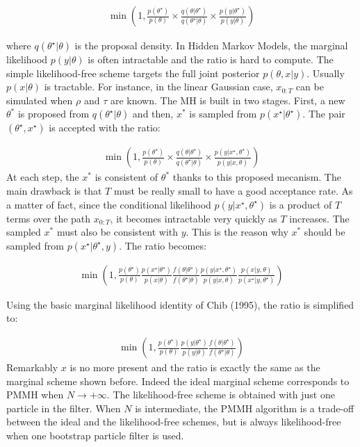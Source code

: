 \documentclass[11pt,a4,twosided,singlespacing,titlepagenumber=on]{scrreprt}
\numberwithin{equation}{chapter} %
\theoremstyle{remark}
\begin{document}
\begin{align*}
\min \left( 1, \frac{p(\theta^\star)}{p(\theta)} \times  \frac{q(\theta|\theta^\star)}{q(\theta^\star|\theta)} \times \frac{p({y}|\theta^\star)}{p({y}|\theta)} \right)
\end{align*}

where $q(\theta^\star|\theta)$ is the proposal density. In Hidden Markov Models, the marginal likelihood $p(y|\theta)$ is often intractable and the ratio is hard to compute. The simple likelihood-free scheme targets the full joint posterior $p(\theta,x|y)$. Usually $p(x|\theta)$ is tractable. For instance, in the linear Gaussian case, $x_{0:T}$ can be simulated when $\rho$ and $\tau$ are known. The MH is built in two stages. First, a new $\theta^*$ is proposed from $q(\theta^\star|\theta)$ and then, $x^*$ is sampled from $p(x^\star|\theta^\star)$. The pair $(\theta^\star,x^\star)$ is accepted with the ratio:

\begin{align*}
\min \left( 1, \frac{p(\theta^\star)}{p(\theta)} \times  \frac{q(\theta|\theta^\star)}{q(\theta^\star|\theta)} \times \frac{p(y|{x}^\star,\theta^\star)}{p(y|{x},\theta)} \right)
\end{align*}
At each step, the $x^*$ is consistent of $\theta^*$ thanks to this proposed mecanism. The main drawback is that $T$ must be really small to have a good acceptance rate. As a matter of fact, since the conditional likelihood $p(y|{x}^\star,\theta^\star)$ is a product of $T$ terms over the path $x_{0:T}$, it becomes intractable very quickly as $T$ increases. The sampled $x^*$ must also be consistent with $y$. This is the reason why $x^*$ should be sampled from $p(x^\star|\theta^\star,y)$. The ratio becomes:

\begin{align*}
 \min \left(1, \frac{p(\theta^\star)}{p(\theta)}   \frac{p({x}^\star|\theta^\star)}{p({x}|\theta)}   \frac{f(\theta|\theta^\star)}{f(\theta^\star|\theta)}   \frac{p(y|{x}^\star,\theta^\star)}{p(y|{x},\theta)}  \frac{p({x}|y,\theta)}{p({x}^\star|y,\theta^\star)} \right)
\end{align*}

Using the basic marginal likelihood identity of Chib (1995), the ratio is simplified to:

\begin{align*}
 \min \left(1, \frac{p(\theta^\star)}{p(\theta)}  \frac{p(y|\theta^\star)}{p(y|\theta)} \frac{f(\theta|\theta^\star)}{f(\theta^\star|\theta)} \right)
\end{align*}
Remarkably $x$ is no more present and the ratio is exactly the same as the marginal scheme shown before. Indeed the ideal marginal scheme corresponds to PMMH when $N \rightarrow +\infty$. The likelihood-free scheme is obtained with just one particle in the filter. When $N$ is intermediate, the PMMH algorithm is a trade-off between the ideal and the likelihood-free schemes, but is always likelihood-free when one bootstrap particle filter is used.
\end{document}
